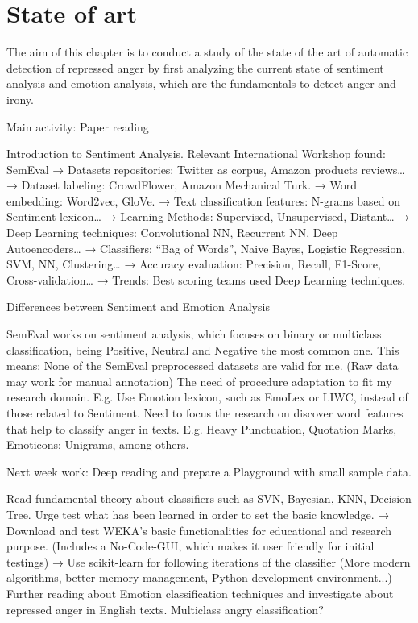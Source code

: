 \chapter{State of art}

The aim of this chapter is to conduct a study of the state of the art of automatic detection of repressed anger by first analyzing the current state of sentiment analysis and emotion analysis, which are the fundamentals to detect anger and irony.





Main activity: Paper reading

Introduction to Sentiment Analysis.
Relevant International Workshop found: SemEval
→ Datasets repositories: Twitter as corpus, Amazon products reviews…
→ Dataset labeling: CrowdFlower, Amazon Mechanical Turk.
→ Word embedding: Word2vec, GloVe.
→ Text classification features: N-grams based on Sentiment lexicon…
→ Learning Methods: Supervised, Unsupervised, Distant…
→ Deep Learning techniques: Convolutional NN, Recurrent NN, Deep Autoencoders…
→ Classifiers: “Bag of Words”, Naive Bayes, Logistic Regression, SVM, NN, Clustering…
→ Accuracy evaluation: Precision, Recall, F1-Score, Cross-validation…
→ Trends: Best scoring teams used Deep Learning techniques.

Differences between Sentiment and Emotion Analysis

SemEval works on sentiment analysis, which focuses on binary or multiclass classification, being Positive, Neutral and Negative the most common one.
This means:
 None of the SemEval preprocessed datasets are valid for me. (Raw data may work for manual annotation)
 The need of procedure adaptation to fit my research domain.
E.g. Use Emotion lexicon, such as EmoLex or LIWC, instead of  those related to Sentiment.
Need to focus the research on discover word features that help to classify anger in texts.
E.g. Heavy Punctuation, Quotation Marks, Emoticons; Unigrams, among others.

Next week work: Deep reading and prepare a Playground with small sample data.

Read fundamental theory about classifiers such as SVN, Bayesian, KNN, Decision Tree.
Urge test what has been learned in order to set the basic knowledge.
→ Download and test WEKA’s basic functionalities for educational and research purpose. (Includes a No-Code-GUI, which makes it user friendly for initial testings)
→ Use scikit-learn for following iterations of the classifier (More modern algorithms, better memory management, Python development environment...)
Further reading about Emotion classification techniques and investigate about repressed anger in English texts. 
Multiclass angry classification?

